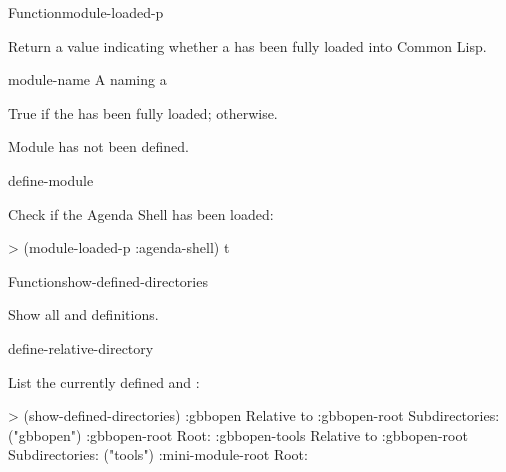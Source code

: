 \documentclass[10pt,twoside,english,pdftex]{article}
\begin{document}
\begin{functiondoc}{Function}{module-loaded-p}{
    \returns{} }
%
%

\fnsyntax 

\fnpurpose Return a value indicating whether a  has been fully
loaded into Common Lisp.

\fnpackage {}

\fnmodule {}

\fnargs
\begin{args}{module-name}
 A  naming a 
\end{args}

\fnreturns True if the  has been fully loaded; \nil{} otherwise.

\fnerrors
Module  has not been defined.

\begin{alsos}{define-module}
\end{alsos}

\fnexample
Check if the Agenda Shell  has been loaded:
%
\begin{example}
\W\supp
> (module-loaded-p :agenda-shell)
t
\end{example} 

\end{functiondoc}


\begin{functiondoc}{Function}{show-defined-directories}{\noargs}
%
%

\fnsyntax

\fnpurpose Show all  and  definitions.

\fnpackage {}

\fnmodule {}

\begin{alsos}{define-relative-directory}
\end{alsos}

\fnexample 
%
List the currently defined  and :
%
\begin{example}
%
\W\supp
> (show-defined-directories)
:gbbopen
    Relative to :gbbopen-root
    Subdirectories: ("gbbopen")
:gbbopen-root
    Root: 
:gbbopen-tools
    Relative to :gbbopen-root
    Subdirectories: ("tools")
:mini-module-root
    Root: 
\end{example}

\end{functiondoc}
\end{document}
